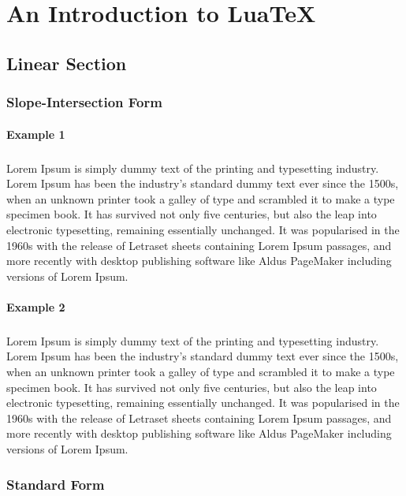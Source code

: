 \documentclass[a4paper, 12pt]{report}
\begin{document}
\chapter{An Introduction to Lua\TeX}
	\section{Linear Section}
  	  	\subsection{Slope-Intersection Form}
  	  		\subsubsection{Example 1}
  	  		\paragraph{}
  	  		Lorem Ipsum is simply dummy text of the printing and typesetting industry. Lorem Ipsum has been the industry's standard dummy text ever since the 1500s, when an unknown printer took a galley of type and scrambled it to make a type specimen book. It has survived not only five centuries, but also the leap into electronic typesetting, remaining essentially unchanged. It was popularised in the 1960s with the release of Letraset sheets containing Lorem Ipsum passages, and more recently with desktop publishing software like Aldus PageMaker including versions of Lorem Ipsum.
  	  		\subsubsection{Example 2}
  	  		\paragraph{}
  	  		Lorem Ipsum is simply dummy text of the printing and typesetting industry. Lorem Ipsum has been the industry's standard dummy text ever since the 1500s, when an unknown printer took a galley of type and scrambled it to make a type specimen book. It has survived not only five centuries, but also the leap into electronic typesetting, remaining essentially unchanged. It was popularised in the 1960s with the release of Letraset sheets containing Lorem Ipsum passages, and more recently with desktop publishing software like Aldus PageMaker including versions of Lorem Ipsum.
  	  		\subsection{Standard Form}
\end{document}
